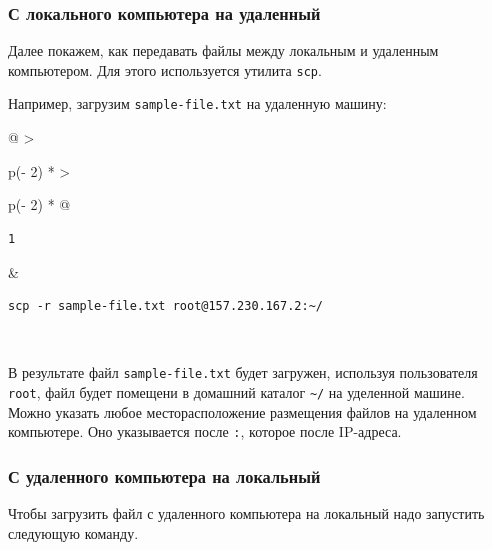 \documentclass{article}
\begin{document}
\hypertarget{From-local-computer-to-remote-machine}{%
\subsubsection{\texorpdfstring{\protect\hyperlink{From-local-computer-to-remote-machine}{}С
локального компьютера на
удаленный}{С локального компьютера на удаленный}}\label{From-local-computer-to-remote-machine}}

Далее покажем, как передавать файлы между локальным и удаленным
компьютером. Для этого используется утилита \texttt{scp}.

Например, загрузим \texttt{sample-file.txt} на удаленную машину:

\begin{longtable}[]{@{}
  >{\raggedright\arraybackslash}p{(\columnwidth - 2\tabcolsep) * }
  >{\raggedright\arraybackslash}p{(\columnwidth - 2\tabcolsep) * }@{}}
\toprule
\endhead
\begin{minipage}[t]{\linewidth}\raggedright
\begin{verbatim}
1
\end{verbatim}
\end{minipage} & \begin{minipage}[t]{\linewidth}\raggedright
\begin{verbatim}
scp -r sample-file.txt root@157.230.167.2:~/
\end{verbatim}
\end{minipage} \\ \addlinespace
\bottomrule
\end{longtable}

В результате файл \texttt{sample-file.txt} будет загружен, используя
пользователя \texttt{root}, файл будет помещени в домашний каталог
\texttt{\textasciitilde{}/} на уделенной машине. Можно указать любое
месторасположение размещения файлов на удаленном компьютере. Оно
указывается после \texttt{:}, которое после IP-адреса.

\hypertarget{From-remote-machine-to-local-computer}{%
\subsubsection{\texorpdfstring{\protect\hyperlink{From-remote-machine-to-local-computer}{}С
удаленного компьютера на
локальный}{С удаленного компьютера на локальный}}\label{From-remote-machine-to-local-computer}}

Чтобы загрузить файл с удаленного компьютера на локальный надо запустить
следующую команду.
\end{document}
